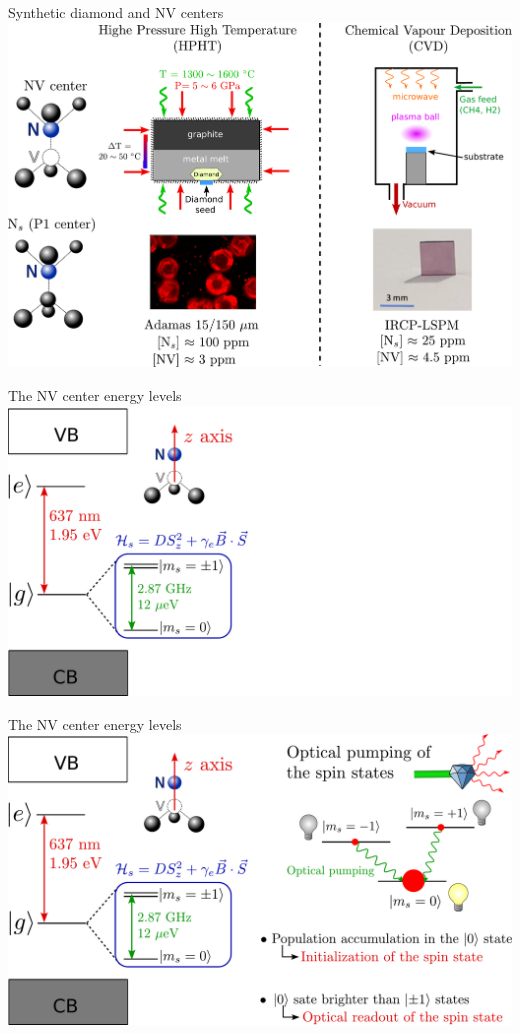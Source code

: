 \documentclass{beamer}
\begin{document}
\begin{frame}{Synthetic diamond and NV centers}
\centering
\includegraphics[width=\textwidth,height=0.9\textheight,keepaspectratio]{Slide_fab_sample}
\end{frame}

\begin{frame}{The NV center energy levels}
\centering
\includegraphics[width=\textwidth,height=0.9\textheight,keepaspectratio]{Slide_NV_levels_1}
\end{frame}

\begin{frame}{The NV center energy levels}
\centering
\includegraphics[width=\textwidth,height=0.9\textheight,keepaspectratio]{Slide_NV_levels}
\end{frame}
\end{document}
